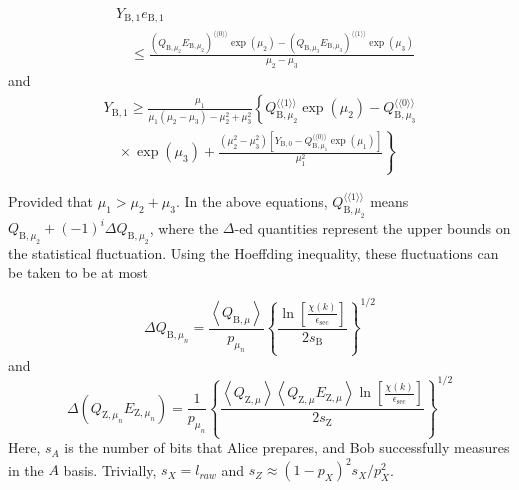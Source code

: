 \documentclass[%
 reprint,
superscriptaddress,
 amsmath,amssymb,
 aps,
]{revtex4-2}
\begin{document}
\begin{equation}
    \begin{aligned}
& Y_{\mathrm{B}, 1} e_{\mathrm{B}, 1} \\
& \quad \leqslant \frac{\left(Q_{\mathrm{B}, \mu_2} E_{\mathrm{B}, \mu_2}\right)^{\langle\langle 0\rangle\rangle} \exp \left(\mu_2\right)-\left(Q_{\mathrm{B}, \mu_3} E_{\mathrm{B}, \mu_3}\right)^{\langle\langle 1\rangle\rangle} \exp \left(\mu_3\right)}{\mu_2-\mu_3}
\end{aligned}
\end{equation}
and
\begin{equation}
    \begin{array}{r}
Y_{\mathrm{B}, 1} \geqslant \frac{\mu_1}{\mu_1\left(\mu_2-\mu_3\right)-\mu_2^2+\mu_3^2}\left\{Q_{\mathrm{B}, \mu_2}^{\langle\langle 1\rangle\rangle} \exp \left(\mu_2\right)-Q_{\mathrm{B}, \mu_3}^{\langle\langle 0\rangle\rangle}\right. \\
\left.\quad \times \exp \left(\mu_3\right)+\frac{\left(\mu_2^2-\mu_3^2\right)\left[Y_{\mathrm{B}, 0}-Q_{\mathrm{B}, \mu_1}^{\langle\langle 0\rangle\rangle} \exp \left(\mu_1\right)\right]}{\mu_1^2}\right\}
\end{array}
\end{equation}

Provided that $\mu_1>\mu_2+\mu_3$. In the above equations, $Q_{\mathrm{B}, \mu_2}^{\langle\langle 1\rangle\rangle}$ means  $Q_{\mathrm{B}, \mu_2}+(-1)^i\Delta Q_{\mathrm{B}, \mu_2}$, where the $\Delta$-ed quantities represent the upper bounds on the statistical fluctuation. Using the Hoeffding inequality, these fluctuations can be taken to be at most

\begin{equation}
    \Delta Q_{\mathrm{B}, \mu_n}=\frac{\left\langle Q_{\mathrm{B}, \mu}\right\rangle}{p_{\mu_n}}\left\{\frac{\ln \left[\frac{\chi(k)}{\epsilon_{\mathrm{sec}}}\right]}{2 s_{\mathrm{B}}}\right\}^{1 / 2}
\end{equation}
and
\begin{equation}
    \Delta\left(Q_{\mathrm{Z}, \mu_n} E_{\mathrm{Z}, \mu_n}\right)=\frac{1}{p_{\mu_n}}\left\{\frac{\left\langle Q_{\mathrm{Z}, \mu}\right\rangle\left\langle Q_{\mathrm{Z}, \mu} E_{\mathrm{Z}, \mu}\right\rangle \ln \left[\frac{\chi(k)}{\epsilon_{\mathrm{sec}}}\right]}{2 s_{\mathrm{Z}}}\right\}^{1 / 2}
\end{equation}
Here, $s_A$ is the number of bits that Alice prepares, and Bob successfully measures in the $A$ basis. Trivially, $s_X=l_{raw}$ and $s_Z\approx(1-p_X)^2s_X/p_X^2$.
\end{document}
